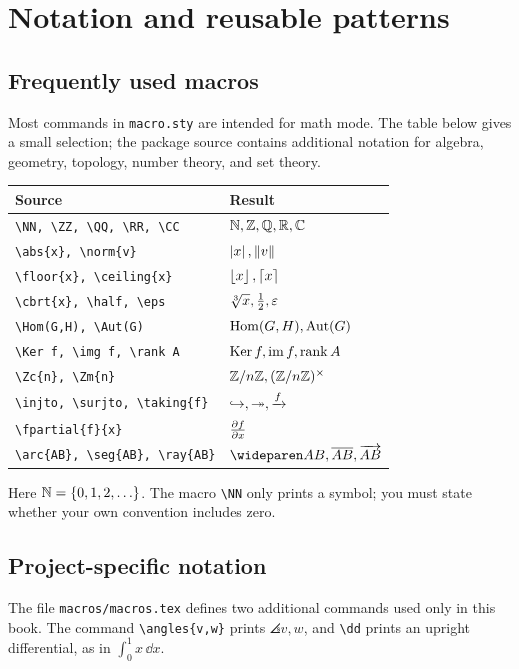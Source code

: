 \documentclass[../../main.tex]{subfiles}
\begin{document}
\chapter{Notation and reusable patterns}
\label{app:notation}

\section{Frequently used macros}
Most commands in \texttt{macro.sty} are intended for math mode. The table
below gives a small selection; the package source contains additional
notation for algebra, geometry, topology, number theory, and set theory.

\begin{fullwidth}
\begin{center}
\renewcommand{\arraystretch}{1.3}
\begin{tabular}{ll}
  \toprule
  Source & Result \\
  \midrule
  \verb|\NN, \ZZ, \QQ, \RR, \CC| & $\mathbb N,\mathbb Z,\mathbb Q,\mathbb R,\mathbb C$ \\
  \verb|\abs{x}, \norm{v}| & $\left\lvert x \right\rvert,\left\lVert v \right\rVert$ \\
  \verb|\floor{x}, \ceiling{x}| & $\left\lfloor x \right\rfloor,\left\lceil x \right\rceil$ \\
  \verb|\cbrt{x}, \half, \eps| & $\sqrt[3]{x},\frac{1}{2},\varepsilon$ \\
  \verb|\Hom(G,H), \Aut(G)| & $\operatorname{Hom}(G,H),\operatorname{Aut}(G)$ \\
  \verb|\Ker f, \img f, \rank A| & $\operatorname{Ker} f,\operatorname{im} f,\operatorname{rank} A$ \\
  \verb|\Zc{n}, \Zm{n}| & $\mathbb Z/n\mathbb Z,(\mathbb Z/n\mathbb Z)^\times$ \\
  \verb|\injto, \surjto, \taking{f}| & $\hookrightarrow,\twoheadrightarrow,\xrightarrow{f}$ \\
  \verb|\fpartial{f}{x}| & $\frac{\partial f}{\partial x}$ \\
  \verb|\arc{AB}, \seg{AB}, \ray{AB}| & $\arc{AB},\seg{AB},\ray{AB}$ \\
  \bottomrule
\end{tabular}
\end{center}
\end{fullwidth}

\begin{notation}
Here $\mathbb N=\{0,1,2,\ldots\}$. The macro \verb|\NN| only prints a symbol;
you must state whether your own convention includes zero.
\end{notation}

\section{Project-specific notation}
The file \texttt{macros/macros.tex} defines two additional commands used
only in this book. The command \verb|\angles{v,w}| prints
$\angles{v,w}$, and \verb|\dd| prints an upright differential, as in
$\int_0^1 x\,\dd x$.
\end{document}
